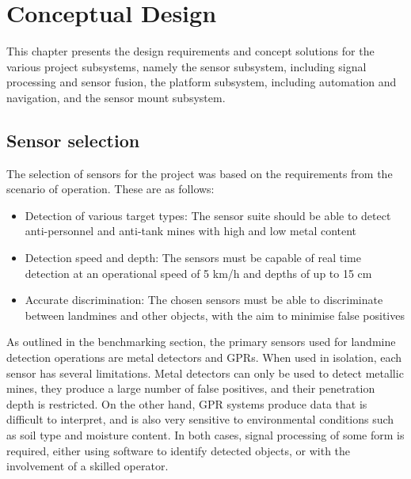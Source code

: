 \documentclass[main.tex]{subfiles}
\begin{document}
\chapter{Conceptual Design}
This chapter presents the design requirements and concept solutions for the various project subsystems, namely the sensor subsystem, including signal processing and sensor fusion, the platform subsystem, including automation and navigation, and the sensor mount subsystem.  


\section{Sensor selection}
The selection of sensors for the project was based on the requirements from the scenario of operation. These are as follows:  

\begin{itemize}
\item Detection of various target types: The sensor suite should be able to detect anti-personnel and anti-tank mines with high and low metal content 
\item Detection speed and depth: The sensors must be capable of real time detection at an operational speed of 5 km/h and depths of up to 15 cm
\item Accurate discrimination: The chosen sensors must be able to discriminate between landmines and other objects, with the aim to minimise false positives
\end{itemize}

As outlined in the benchmarking section, the primary sensors used for landmine detection operations are metal detectors and GPRs. When used in isolation, each sensor has several limitations. Metal detectors can only be used to detect metallic mines, they produce a large number of false positives, and their penetration depth is restricted. On the other hand, GPR systems produce data that is difficult to interpret, and is also very sensitive to environmental conditions such as soil type and moisture content. In both cases, signal processing of some form is required, either using software to identify detected objects, or with the involvement of a skilled operator.
\end{document}

